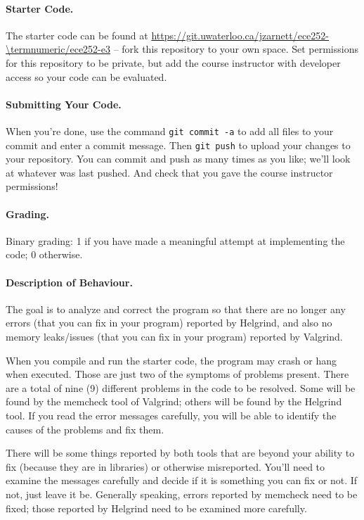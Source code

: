 \paragraph{Starter Code.} The starter code can be found at \url{https://git.uwaterloo.ca/jzarnett/ece252-\termnumeric/ece252-e3} -- fork this repository to your own space. Set permissions for this repository to be private, but add the course instructor with developer access so your code can be evaluated.

\paragraph{Submitting Your Code.} When you're done, use the command \texttt{git commit -a} to add all files to your commit and enter a commit message. Then \texttt{git push} to upload your changes to your repository. You can commit and push as many times as you like; we'll look at whatever was last pushed. And check that you gave the course instructor permissions!

\paragraph{Grading.} Binary grading: 1 if you have made a meaningful attempt at implementing the code; 0 otherwise.

\paragraph{Description of Behaviour.} The goal is to analyze and correct the program so that there are no longer any errors (that you can fix in your program) reported by Helgrind, and also no memory leaks/issues (that you can fix in your program) reported by Valgrind.

When you compile and run the starter code, the program may crash or hang when executed. Those are just two of the symptoms of problems present. There are a total of nine (9) different problems in the code to be resolved. Some will be found by the memcheck tool of Valgrind; others will be found by the Helgrind tool. If you read the error messages carefully, you will be able to identify the causes of the problems and fix them.

There will be some things reported by both tools that are beyond your ability to fix (because they are in libraries) or otherwise misreported. You'll need to examine the messages carefully and decide if it is something you can fix or not. If not, just leave it be. Generally speaking, errors reported by memcheck need to be fixed; those reported by Helgrind need to be examined more carefully.

